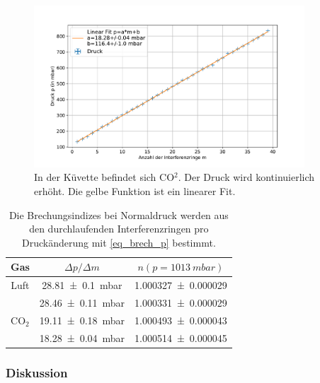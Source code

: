 \documentclass[
	a4paper,
	12pt,
	pagesize,
	ngerman
]{scrartcl}
\begin{document}
\begin{figure}[H]
		\includegraphics[width=0.9\textwidth]{images/CO2_Rein.pdf}
		\centering
		\caption{In der Küvette befindet sich CO$^2$. Der Druck wird kontinuierlich erhöht. Die gelbe Funktion ist ein linearer Fit.}
		\label{fig_co2_rein}
	\end{figure}



	\begin{table}[H]
		\centering
		\begin{tabular}{| c | c | c |}
			\hline
			  Gas &  $\Delta p/\Delta m$ & $n(p=\SI{1013}{mbar})$\\ \hline
				Luft& \SI{28.81+-0.1}{mbar} & \SI{1.000327+-0.000029}{}\\
				&\SI{28.46+-0.11}{mbar}&\SI{1.000331+-0.000029}{}\\
				CO$_2$ & \SI{19.11+-0.18}{mbar} & \SI{1.000493+-0.000043}{}\\
				&\SI{18.28+-0.04}{mbar}&\SI{1.000514+-0.000045}{}\\
				\hline
		\end{tabular}
		\caption{Die Brechungsindizes bei Normaldruck werden aus den durchlaufenden Interferenzringen pro Druckänderung mit \cref{eq_brech_p} bestimmt.} %
		\label{tb_gase}
	\end{table}

	\subsubsection{Diskussion}
\end{document}

